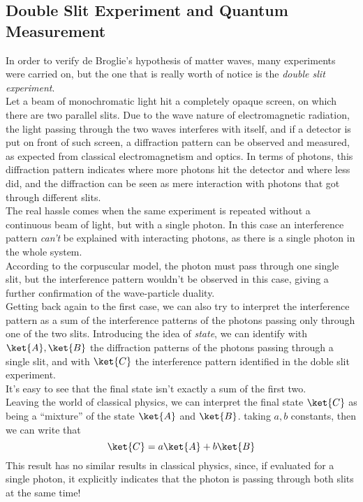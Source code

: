 \documentclass[../qm.tex]{subfiles}
\begin{document}
	\subsection{Double Slit Experiment and Quantum Measurement}
	In order to verify de Broglie's hypothesis of matter waves, many experiments were carried on, but the one that is really worth of notice is the \textit{double slit experiment}.\\
	Let a beam of monochromatic light hit a completely opaque screen, on which there are two parallel slits. Due to the wave nature of electromagnetic radiation, the light passing through the two waves interferes with itself, and if a detector is put on front of such screen, a diffraction pattern can be observed and measured, as expected from classical electromagnetism and optics. In terms of photons, this diffraction pattern indicates where more photons hit the detector and where less did, and the diffraction can be seen as mere interaction with photons that got through different slits.\\
	The real hassle comes when the same experiment is repeated without a continuous beam of light, but with a single photon. In this case an interference pattern \emph{can't} be explained with interacting photons, as there is a single photon in the whole system.\\
	According to the corpuscular model, the photon must pass through one single slit, but the interference pattern wouldn't be observed in this case, giving a further confirmation of the wave-particle duality.\\
	Getting back again to the first case, we can also try to interpret the interference pattern as a sum of the interference patterns of the photons passing only through one of the two slits. Introducing the idea of \textit{state}, we can identify with $\ket{A},\ket{B}$ the diffraction patterns of the photons passing through a single slit, and with $\ket{C}$ the interference pattern identified in the doble slit experiment.\\
	It's easy to see that the final state isn't exactly a sum of the first two.\\
	Leaving the world of classical physics, we can interpret the final state $\ket{C}$ as being a ``mixture'' of the state $\ket{A}$ and $\ket{B}$. taking $a,b$ constants, then we can write that
	\begin{equation*}
		\ket{C}=a\ket{A}+b\ket{B}
	\end{equation*}
	This result has no similar results in classical physics, since, if evaluated for a single photon, it explicitly indicates that the photon is passing through both slits at the same time!\\
\end{document}
